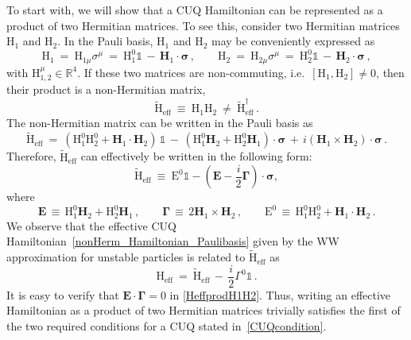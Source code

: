 \documentclass[12pt,a4paper]{article}
\begin{document}
To start with, we will show that a CUQ Hamiltonian can be represented as a product of two Hermitian matrices. To see this, consider two Hermitian matrices $\mathrm{H}_1$ and $\mathrm{H}_2$. In the Pauli basis, $\mathrm{H}_1$ and $\mathrm{H}_2$ may be conveniently expressed as
\begin{equation}
    \mathrm{H}_{1}\: =\: \mathrm{H}_{1\mu}\sigma^\mu\: =\: \mathrm{H}^0_1\mathbb{1} \,-\, \mathbf{H}_1\cdot\boldsymbol{\sigma}\,,\qquad \mathrm{H}_{2}\: =\: \mathrm{H}_{2\mu}\sigma^\mu\: =\: \mathrm{H}^0_2\mathbb{1}\, -\, \mathbf{H}_2\cdot\boldsymbol{\sigma}\,,
\end{equation}
with $\text{H}^\mu_{1,2} \in \mathbb{R}^4$. 
If these two matrices are non-commuting, i.e.~$[\mathrm{H}_1,\mathrm{H}_2]\neq 0$, then their product is a non-Hermitian matrix, 
\begin{equation}
    \widetilde{\mathrm{H}}_{\text{eff}}\: \equiv\: \mathrm{H}_1\mathrm{H}_2\: \ne\: \widetilde{\mathrm{H}}_{\text{eff}}^\dagger\,.
\end{equation}
The non-Hermitian matrix can be written in the Pauli basis as
\begin{equation}
    \widetilde{\mathrm{H}}_{\text{eff}}\: =\: (\mathrm{H}_1^0\mathrm{H}_2^0+\mathbf{H}_1\cdot\mathbf{H}_2)\,\mathbb{1}\,-\,(\mathrm{H}_1^0\mathbf{H}_2+\mathrm{H}_2^0\mathbf{H}_1)\cdot\boldsymbol{\sigma}\, +\,i(\mathbf{H}_1\times \mathbf{H}_2)\cdot\boldsymbol{\sigma}\, .
\end{equation}
Therefore, $\widetilde{\mathrm{H}}_{\text{eff}}$ can effectively be written in the following form:
\begin{equation}
    \widetilde{\mathrm{H}}_{\text{eff}}\: \equiv\:  \mathrm{E}^0\mathbb{1} -\left(\mathbf{E}-\dfrac{i}{2}\boldsymbol{\Gamma}\right)\cdot\boldsymbol{\sigma},\label{Heffnewform}
\end{equation}
where
\begin{equation}
   \label{HeffprodH1H2}
        \mathbf{E}\,\equiv\, \mathrm{H}_1^0\mathbf{H}_2+\mathrm{H}_2^0\mathbf{H}_1\,,\qquad
        \boldsymbol{\Gamma}\,\equiv\,2\mathbf{H}_1\times \mathbf{H}_2\,,\qquad
        \text{E}^0\,\equiv\,\mathrm{H}_1^0\mathrm{H}_2^0 + \mathbf{H}_1\cdot \mathbf{H}_2\,.
\end{equation}
We observe that the effective CUQ Hamiltonian~\eqref{nonHerm_Hamiltonian_Paulibasis} given by the WW approximation for unstable particles is related to $\widetilde{\mathrm{H}}_{\text{eff}}$ as
\begin{equation}
    \mathrm{H}_{\text{eff}}\: =\: \widetilde{\mathrm{H}}_{\text{eff}}\,-\, \dfrac{i}{2}\Gamma^0\mathbb{1}\,.
\end{equation}
It is easy to verify that $\mathbf{E}\cdot\boldsymbol{\Gamma} =0$ in \eqref{HeffprodH1H2}. Thus, writing an effective Hamiltonian as a product of two Hermitian matrices trivially satisfies the first of the two required conditions for a CUQ stated in~\eqref{CUQcondition}. 
\end{document}

